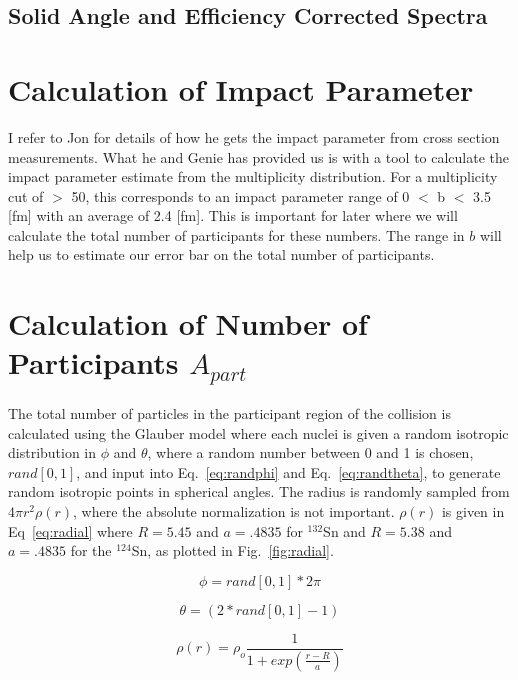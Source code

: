 \documentclass[12pt, letterpaper, twoside]{article}
\begin{document}
 \subsection{Solid Angle and Efficiency Corrected Spectra}


 
 \section{Calculation of Impact Parameter}
 I refer to Jon for details of how he gets the impact parameter from cross section measurements. What he and Genie has provided us is with a tool to calculate the impact parameter estimate from the multiplicity distribution. For a multiplicity cut of $>$ 50, this corresponds to an impact parameter range of 0 $<$ b $<$ 3.5 [fm] with an average of 2.4 [fm]. This is important for later where we will calculate the total number of participants for these numbers. The range in $b$ will help us to estimate our error bar on the total number of participants. 
 
 \section{Calculation of Number of Participants $A_{part}$}
 The total number of particles in the participant region of the collision is calculated using the Glauber model where each nuclei is given a random isotropic distribution in $\phi$ and $\theta$, where a random number between 0 and 1 is chosen, $rand[0,1]$, and input into Eq.~\ref{eq:randphi} and Eq.~\ref{eq:randtheta}, to generate random isotropic points in spherical angles. The radius is randomly sampled from $4\pi r^{2}\rho(r)$, where the absolute normalization is not important. $\rho(r)$ is given in Eq~\ref{eq:radial} where $R=5.45$ and $a=.4835$ for ${}^{132}$Sn and $R=5.38$ and $a=.4835$ for the ${}^{124}$Sn, as plotted in Fig.~\ref{fig:radial}.
 
 \begin{equation}
 \phi = rand[0,1] * 2\pi
 \label{eq:randphi}
 \end{equation}
 
 \begin{equation}
  \theta = (2*rand[0,1] - 1)
  \label{eq:randtheta}
 \end{equation}
 
 \begin{equation}
 \rho(r) = \rho_{o} \frac{1}{1+ exp(\frac{r-R}{a})}
 \label{eq:radial}
 \end{equation}
 
\end{document}
